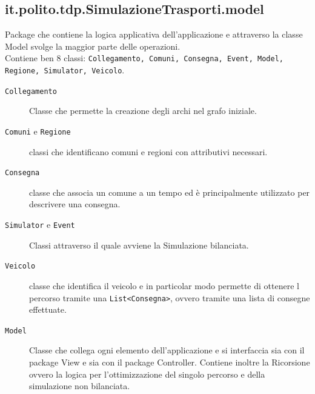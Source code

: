 \documentclass[a4paper,12pt]{report}
\begin{document}
\subsection{it.polito.tdp.SimulazioneTrasporti.model}
Package che contiene la logica applicativa dell'applicazione e attraverso la classe Model svolge la maggior parte delle operazioni.\\
Contiene ben 8 classi: \texttt{Collegamento, Comuni, Consegna, Event, Model, Regione, Simulator, Veicolo}.\\
\begin{description}
	\item[\texttt{Collegamento}] Classe che permette la creazione degli archi nel grafo iniziale.
	\item[\texttt{Comuni} e \texttt{Regione}] classi che identificano comuni e regioni con attributivi necessari.
	\item[\texttt{Consegna}] classe che associa un comune a un tempo ed è principalmente utilizzato per descrivere una consegna.
	\item[\texttt{Simulator} e \texttt{Event}] Classi attraverso il quale avviene la Simulazione bilanciata.
	\item[\texttt{Veicolo}]  classe che identifica il veicolo e in particolar modo permette di ottenere l percorso tramite una \texttt{List<Consegna>}, ovvero tramite una lista di consegne effettuate.
	\item[\texttt{Model}] Classe che collega ogni elemento dell'applicazione e si interfaccia sia con il package View e sia con il package Controller. Contiene inoltre la Ricorsione ovvero la logica per l'ottimizzazione del singolo percorso e della simulazione non bilanciata.
\end{description}
\end{document}
